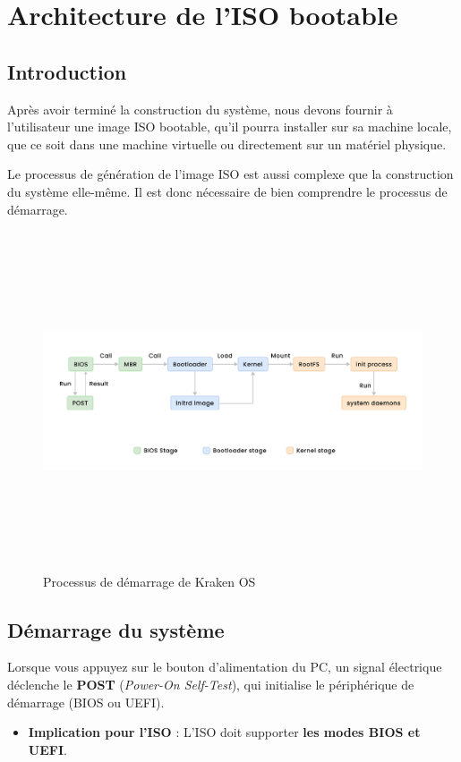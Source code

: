 \chapter{Architecture de l’ISO bootable }
\minitoc

\clearpage
\section{Introduction}

Après avoir terminé la construction du système, nous devons fournir à l’utilisateur une image ISO bootable, qu’il pourra installer sur sa machine locale, que ce soit dans une machine virtuelle ou directement sur un matériel physique.

Le processus de génération de l’image ISO est aussi complexe que la construction du système elle-même. Il est donc nécessaire de bien comprendre le processus de démarrage.

\begin{figure}[H]
  \centering
  \includegraphics[width=1\textwidth, height=10cm]{images_pfe/bootloader process.png}
  \caption{Processus de démarrage de Kraken OS}
  \label{fig:kbootproc}
\end{figure}





\section{Démarrage du système}  
Lorsque vous appuyez sur le bouton d’alimentation du PC, un signal électrique déclenche le \textbf{POST} (\emph{Power-On Self-Test}), qui initialise le périphérique de démarrage (BIOS ou UEFI).  
\begin{itemize}  
  \item \textbf{Implication pour l’ISO} : L’ISO doit supporter \textbf{les modes BIOS et UEFI}.  
\end{itemize}  

